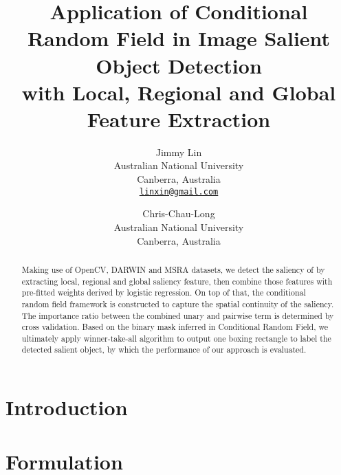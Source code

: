 \documentclass[10pt,twocolumn,letterpaper]{article}
\begin{document}
\title{Application of Conditional Random Field in Image Salient Object Detection\\ with Local, Regional and Global Feature Extraction}

\author{Jimmy Lin\\
Australian National University\\
Canberra, Australia\\
{\tt\small \url{linxin@gmail.com}}
\and
Chris-Chau-Long\\
Australian National University\\
Canberra, Australia\\
{\small\url{}}
}

\maketitle

\begin{abstract}
    Making use of OpenCV, DARWIN and MSRA datasets, we detect the saliency of by extracting local, 
    regional and global saliency feature, 
    then combine those features with pre-fitted weights derived by logistic regression.
    On top of that, the conditional random field framework is constructed to capture the spatial continuity of the saliency.
    The importance ratio between the combined unary and pairwise term is determined by cross validation.
    Based on the binary mask inferred in Conditional Random Field, we ultimately apply winner-take-all algorithm to 
    output one boxing rectangle to label the detected salient object, by which the performance of our 
    approach is evaluated. 
\end{abstract}

\section{Introduction}

\section{Formulation}
\end{document}
